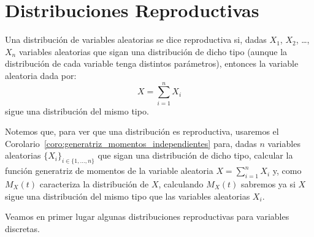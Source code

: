 \section{Distribuciones Reproductivas}

\begin{definicion}
    Una distribución de variables aleatorias se dice reproductiva si, dadas $X_1$, $X_2$, \ldots, $X_n$ variables aleatorias que sigan una distribución de dicho tipo (aunque la distribución de cada variable tenga distintos parámetros), entonces la variable aleatoria dada por:
    \begin{equation*}
        X = \sum_{i=1}^{n} X_i
    \end{equation*}
    sigue una distribución del mismo tipo.
\end{definicion}

\begin{observacion}
    Notemos que, para ver que una distribución es reproductiva, usaremos el Corolario~\ref{coro:generatriz_momentos_independientes} para, dadas $n$ variables aleatorias $\{X_i\}_{i \in \{1,\ldots,n\}}$ que sigan una distribución de dicho tipo, calcular la función generatriz de momentos de la variable aleatoria $X=\sum\limits_{i=1}^n X_i$ y, como $M_X(t)$ caracteriza la distribución de $X$, calculando $M_X(t)$ sabremos ya si $X$ sigue una distribución del mismo tipo que las variables aleatorias $X_i$.
\end{observacion}

Veamos en primer lugar algunas distribuciones reproductivas para variables discretas.


